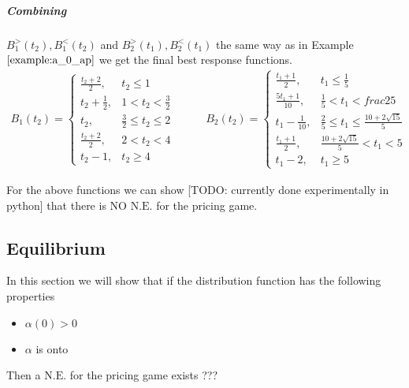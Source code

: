 \documentclass[a4paper,11pt]{article}
\newcommand{\NE}{\mathrm{N.E.}}
\begin{document}
\subparagraph{Combining} $B_1^>(t_2), B_1^<(t_2)$ and $B_2^>(t_1), B_2^<(t_1)$ the same way as in Example $\ref{example:a_0_ap}$ we get the final best response functions.
\begin{equation*}
	\begin{aligned}
		B_1(t_2) =
		\begin{cases}
			\frac{t_2 + 2}2, & t_2 \le 1 \\
			t_2 + \frac12, & 1 < t_2 < \frac32 \\
			t_2, & \frac32 \le t_2 \le 2 \\
			\frac{t_2 + 2}2, & 2 < t_2 < 4 \\
			t_2 - 1, & t_2 \ge 4
		\end{cases}
	\end{aligned}
	\qquad
	\begin{aligned}
		B_2(t_2) =
		\begin{cases}
			\frac{t_1 + 1}2, & t_1 \le \frac15 \\
			\frac{5 t_1 + 1}{10}, & \frac15 < t_1 < frac25 \\
			t_1 - \frac1{10}, & \frac25 \le t_1 \le \frac{10 + 2 \sqrt{15}}5 \\
			\frac{t_1 + 1}2, & \frac{10 + 2 \sqrt{15}}5 < t_1 < 5 \\
			t_1 - 2, & t_1 \ge 5
		\end{cases}
	\end{aligned}
\end{equation*}

For the above functions we can show [TODO: currently done experimentally in python] that there is NO $\NE$ for the pricing game.


\subsection{Equilibrium}

In this section we will show that if the distribution function has the following properties
\begin{itemize}
	\item $\alpha(0) > 0$
	\item $\alpha$ is onto
\end{itemize}
Then a $\NE$ for the pricing game exists ???
\end{document}
